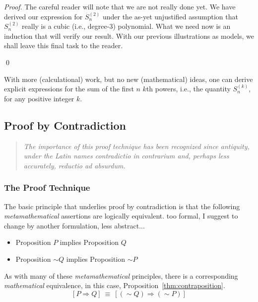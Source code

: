 \begin{proof}
\medskip

The careful reader will note that we are not really done yet.  We
have derived our expression for $S^{(2)}_n$ under the as-yet
unjustified assumption that $S^{(2)}_n$ really is a cubic (i.e.,
degree-$3$) polynomial.  What we need now is an induction that will
verify our result.  With our previous illustrations as models, we
shall leave this final task to the reader.

\qed
\end{proof}

With more (calculational) work, but no new (mathematical) ideas, one
can derive explicit expressions for the sum of the first $n$ $k$th
powers, i.e., the quantity $S^{(k)}_n$, for any positive integer $k$.


\subsection{Proof by Contradiction}
\label{sec:Contradiction}

\begin{quote}
{\em The importance of this proof technique has been recognized since
  antiquity, under the Latin names {\em contradictio in contrarium}
  and, perhaps less accurately, {\em reductio ad absurdum}.}
\end{quote}



\subsubsection{The Proof Technique}
\label{sec:contradiction-technique}


The basic principle that underlies proof by contradiction is that the
following {\em metamathematical} assertions are logically equivalent.
{\Denis too formal, I suggest to change by another formulation, less abstract...}
\begin{itemize}
\item
Proposition $P$ {\sc implies} Proposition $Q$
\item
Proposition $\sim Q$ {\sc implies} Proposition $\sim P$
\end{itemize}

As with many of these {\em metamathematical} principles, there is a
corresponding {\em mathematical} equivalence, in this case,
Proposition~\ref{thm:contraposition}.
\[ [P \Rightarrow Q] \ \equiv \ [(\sim Q) \Rightarrow (\sim P)] \]


